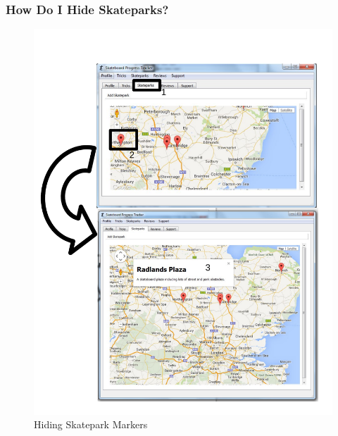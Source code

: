 \subsubsection{How Do I Hide Skateparks?} 

\begin{figure}[H]
    \includegraphics[width=\textwidth]{./Manual/Images/HideSkatepark.pdf}
    \caption{Hiding Skatepark Markers} \label{fig:Hide Skatepark}
\end{figure}

